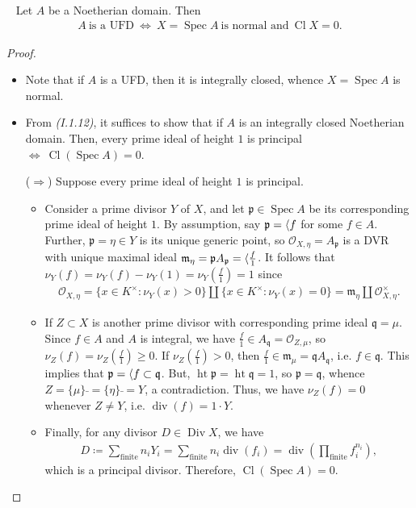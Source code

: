 \documentclass[11pt,a4paper,footinclude=true,headinclude=true]{scrbook} %
\DeclareMathOperator{\Spec}{Spec}
\DeclareMathOperator{\Ht}{ht}
\DeclareMathOperator{\Div}{Div}
\DeclareMathOperator{\Cl}{Cl}
\DeclareMathOperator{\dv}{div}
\newcommand{\OO}{\mathcal{O}}
\newcommand{\pp}{\mathfrak{p}}
\newcommand{\qq}{\mathfrak{q}}
\newcommand{\mm}{\mathfrak{m}}
\newcommand{\<}{\langle}
\let\>\relax
\newcommand{\>}{\rangle}
\newenvironment{proposition}[2][]
{\renewcommand\theinnercustomprop{#2}\innercustomprop[#1] 
\begin{mdframed}[backgroundcolor=gray!20]\ }
{\end{mdframed}\endinnercustomprop}
\begin{document}
\begin{proposition}{6.2}
    Let $A$ be a Noetherian domain. Then 
    \begin{align*}
        A\ \text{is a UFD}\ \Longleftrightarrow\ X=\Spec A\ \text{is normal and}\ \Cl X=0.
    \end{align*}
\end{proposition}
\begin{proof}\mbox{}
    \begin{itemize}
        \item Note that if $A$ is a UFD, then it is integrally closed, whence $X=\Spec A$ is normal.
        \item From \textit{(I.1.12)}, it suffices to show that if $A$ is an integrally closed Noetherian domain. Then,  every prime ideal of height $1$ is principal $\Longleftrightarrow\ \Cl(\Spec A)=0$.
        
        ($\Rightarrow$) Suppose every prime ideal of height $1$ is principal.
        \begin{itemize}
            \item Consider a prime divisor $Y$ of $X$, and let $\pp\in\Spec A$ be its corresponding prime ideal of height $1$. By assumption, say $\pp=\<f\>$ for some $f\in A$. Further, $\pp=\eta\in Y$ is its unique generic point, so $\OO_{X,\eta}=A_\pp$ is a DVR with unique maximal ideal $\mm_\eta=\pp A_\pp=\<\frac{f}{1}\>$. It follows that $\nu_Y(f)=\nu_Y(f)-\nu_Y(1)=\nu_Y(\frac{f}{1})=1$ since 
            \begin{align*}
                \OO_{X,\eta}=\{x\in K^\times:\nu_Y(x)>0\}\amalg\{x\in K^\times:\nu_Y(x)=0\}=\mm_\eta\amalg\OO_{X,\eta}^\times.
            \end{align*}
            \item If $Z\subset X$ is another prime divisor with corresponding prime ideal $\qq=\mu$. Since $f\in A$ and $A$ is integral, we have $\frac{f}{1}\in A_\qq=\OO_{Z,\mu}$, so $\nu_Z(f)=\nu_Z(\frac{f}{1})\geq0$. If $\nu_Z(\frac{f}{1})>0$, then $\frac{f}{1}\in\mm_\mu=\qq A_\qq$, i.e. $f\in\qq$. This implies that $\pp=\<f\>\subset\qq$. But, $\Ht\pp=\Ht\qq=1$, so $\pp=\qq$, whence $Z=\{\mu\}\bar{}=\{\eta\}\bar{}=Y$, a contradiction.
            Thus, we have $\nu_Z(f)=0$ whenever $Z\neq Y$, i.e. $\dv(f)=1\cdot Y$.
            \item Finally, for any divisor $D\in\Div X$, we have
            \begin{align*}
                D\coloneqq\sum_{\text{finite}}n_iY_i=\sum_{\text{finite}}n_i\dv(f_i)=\dv(\prod_{\text{finite}}f_i^{n_i}),
            \end{align*}
            which is a principal divisor. Therefore, $\Cl(\Spec A)=0$.
            

\end{itemize}
\end{itemize}
\end{proof}
\end{document}
